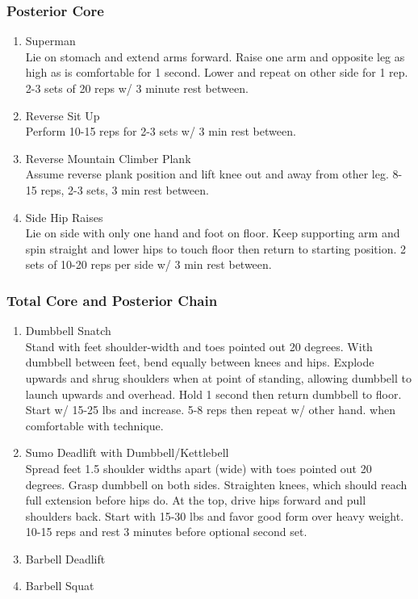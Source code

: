 \documentclass[12pt, letterpaper]{article}
\begin{document}
\subsubsection{Posterior Core}

\begin{enumerate}

    \item Superman\\ 
          Lie on stomach and extend arms forward. Raise one arm and opposite leg as high as is comfortable for 1 second.
          Lower and repeat on other side for 1 rep. 2-3 sets of 20 reps w/ 3 minute rest between.
    \item Reverse Sit Up\\ 
          Perform 10-15 reps for 2-3 sets w/ 3 min rest between.
    \item Reverse Mountain Climber Plank\\ 
          Assume reverse plank position and lift knee out and away from other leg. 8-15 reps, 2-3 sets, 3 min rest between.
    \item Side Hip Raises\\ 
          Lie on side with only one hand and foot on floor. Keep supporting arm and spin straight and lower hips to touch floor
          then return to starting position. 2 sets of 10-20 reps per side w/ 3 min rest between.
\end{enumerate}

\subsubsection{Total Core and Posterior Chain}

\begin{enumerate}

    \item Dumbbell Snatch\\ 
          Stand with feet shoulder-width and toes pointed out 20 degrees. With dumbbell between feet, bend equally between knees and hips. 
          Explode upwards and shrug shoulders when at point of standing, allowing dumbbell to launch upwards and overhead. 
          Hold 1 second then return dumbbell to floor. Start w/ 15-25 lbs and increase. 5-8 reps then repeat w/ other hand. 
          when comfortable with technique.
    \item Sumo Deadlift with Dumbbell/Kettlebell\\ 
          Spread feet 1.5 shoulder widths apart (wide) with toes pointed out 20 degrees. Grasp dumbbell on both sides. 
          Straighten knees, which should reach full extension before hips do. At the top, drive hips forward and pull
          shoulders back. Start with 15-30 lbs and favor good form over heavy weight. 
          10-15 reps and rest 3 minutes before optional second set.
    \item Barbell Deadlift \\ 
    \item Barbell Squat \\ 
    
\end{enumerate}
\end{document}

